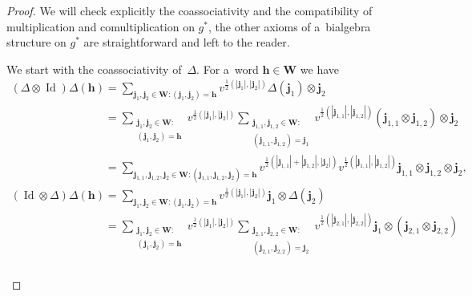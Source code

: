 \documentclass[11pt]{article}
\numberwithin{equation}{section}
\begin{document}
\begin{proof}
We will check explicitly the coassociativity and the compatibility of multiplication and comultiplication on $g^*$, the
other axioms of a~bialgebra structure on $g^*$ are straightforward and left to the reader.

We start with the coassociativity of~$\Delta$.
For a~word $\mathbf{h}\in\mathbf{W}$ we have
\begin{gather*}
(\Delta\otimes\operatorname{Id})\Delta(\mathbf{h})
=\sum\limits_{\mathbf{j}_1,\mathbf{j}_2\in\mathbf{W}:(\mathbf{j}_1,\mathbf{j}_2)=\mathbf{h}}
v^{\frac{1}{2}(|\mathbf{j}_1|,|\mathbf{j}_2|)}\Delta(\mathbf{j}_1)
\otimes\mathbf{j}_2
\\
\phantom{(\Delta\otimes\operatorname{Id})\Delta(\mathbf{h})}
=\sum\limits_{\substack{\mathbf{j}_1,\mathbf{j}_2\in\mathbf{W}:\\(\mathbf{j}_1,\mathbf{j}_2)=\mathbf{h}}}
v^{\frac{1}{2}(|\mathbf{j}_1|,|\mathbf{j}_2|)}
\sum\limits_{\substack{\mathbf{j}_{1,1},\mathbf{j}_{1,2}\in\mathbf{W}:\\(\mathbf{j}_{1,1},\mathbf{j}_{1,2})=\mathbf{j}_1}}
v^{\frac{1}{2}(|\mathbf{j}_{1,1}|,|\mathbf{j}_{1,2}|)}(\mathbf{j}_{1,1}\otimes\mathbf{j}_{1,2})
\otimes\mathbf{j}_2
\\
\phantom{(\Delta\otimes\operatorname{Id})\Delta(\mathbf{h})}
=\sum\limits_{\mathbf{j}_{1,1},\mathbf{j}_{1,2},\mathbf{j}_2\in\mathbf{W}:(\mathbf{j}_{1,1},\mathbf{j}_{1,2},\mathbf{j}_2)=\mathbf{h}}
v^{\frac{1}{2}(|\mathbf{j}_{1,1}|+|\mathbf{j}_{1,2}|,|\mathbf{j}_2|)}
v^{\frac{1}{2}(|\mathbf{j}_{1,1}|,|\mathbf{j}_{1,2}|)}\mathbf{j}_{1,1}\otimes\mathbf{j}_{1,2}\otimes\mathbf{j}_2,
\\
(\operatorname{Id}\otimes\Delta)\Delta(\mathbf{h})
=\sum\limits_{\mathbf{j}_1,\mathbf{j}_2\in\mathbf{W}:(\mathbf{j}_1,\mathbf{j}_2)=\mathbf{h}}
v^{\frac{1}{2}(|\mathbf{j}_1|,|\mathbf{j}_2|)}\mathbf{j}_1\otimes\Delta(\mathbf{j}_2)
\\
\phantom{(\operatorname{Id}\otimes\Delta)\Delta(\mathbf{h})}
=\sum\limits_{\substack{\mathbf{j}_1,\mathbf{j}_2\in\mathbf{W}:\\(\mathbf{j}_1,\mathbf{j}_2)=\mathbf{h}}}
v^{\frac{1}{2}(|\mathbf{j}_1|,|\mathbf{j}_2|)}
\sum\limits_{\substack{\mathbf{j}_{2,1},\mathbf{j}_{2,2}\in\mathbf{W}:\\(\mathbf{j}_{2,1},\mathbf{j}_{2,2})=\mathbf{j}_2}}
v^{\frac{1}{2}(|\mathbf{j}_{2,1}|,|\mathbf{j}_{2,2}|)}\mathbf{j}_1\otimes(\mathbf{j}_{2,1}\otimes\mathbf{j}_{2,2})
\\
\phantom{(\operatorname{Id}\otimes\Delta)\Delta(\mathbf{h})}

\end{gather*}
\end{proof}
\end{document}
